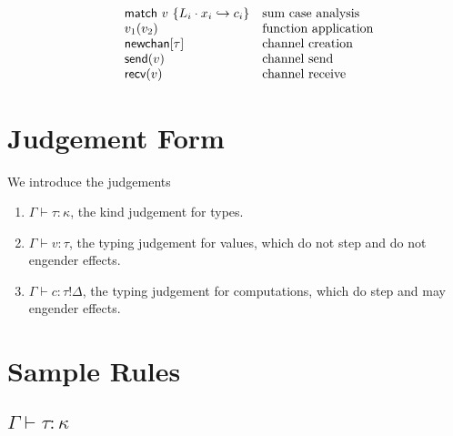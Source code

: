 \documentclass[12pt]{article}
\begin{document}
\[\begin{array}{l r l l}
                &            & \textsf{match} \ v \ \{
                               L_i \cdot x_i \hookrightarrow c_i
                               \}                                & \text{sum case analysis} \\
                &            & v_1 (v_2)                         & \text{function application} \\
                &            & \textsf{newchan}[\tau]            & \text{channel creation} \\
                &            & \textsf{send}(v)                  & \text{channel send} \\
                &            & \textsf{recv}(v)                  & \text{channel receive} \\
\end{array}
\]

\newpage
\section{Judgement Form}

We introduce the judgements
\begin{enumerate}
\item $\Gamma \vdash \tau : \kappa$, the kind judgement for types.
\item $\Gamma \vdash v : \tau$, the typing judgement for values, which do not
step and do not engender effects.
\item $\Gamma \vdash c : \tau!\Delta$, the typing judgement for computations,
which do step and may engender effects.
\end{enumerate}

\newpage
\section{Sample Rules}

\subsection{$\Gamma \vdash \tau : \kappa$}
\end{document}
